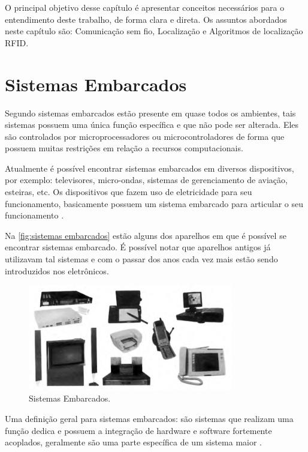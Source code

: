 \label{chapter:conceitos}
O principal objetivo desse capítulo é apresentar conceitos necessários para o entendimento deste trabalho, de forma clara e direta. Os assuntos abordados neste capítulo são: Comunicação sem fio, Localização e Algoritmos de localização RFID.
\section{Sistemas Embarcados}
    \par
    Segundo \citeauthor{rodrigo2016} sistemas embarcados estão presente em quase todos os ambientes, tais sistemas possuem uma única função específica e que não pode ser alterada. Eles são controlados por microprocessadores ou microcontroladores de forma que possuem muitas restrições em relação a recursos computacionais.

    \par
    Atualmente é possível encontrar sistemas embarcados em diversos dispositivos, por exemplo: televisores, micro-ondas, sistemas de gerenciamento de aviação, esteiras, etc. Os dispositivos que fazem uso de eletricidade para seu funcionamento, basicamente possuem um sistema embarcado para articular o seu funcionamento \cite{rodrigo2016}.
    
    \par
    Na \autoref{fig:sistemas embarcados} estão alguns dos aparelhos em que é possível se encontrar sistemas embarcado. É possível notar que aparelhos antigos já utilizavam tal sistemas e com o passar dos anos cada vez mais estão sendo introduzidos nos eletrônicos.
    \begin{figure}[h!]
              \caption{\label{fig:sistemas embarcados}{Sistemas Embarcados.}}
              \centering
              \includegraphics[width=0.8\textwidth]{Figuras/systems_embedded.PNG}
            \end{figure}
    \par
    Uma definição geral para sistemas embarcados: são sistemas que realizam uma função dedica e possuem a integração de hardware e software fortemente acoplados, geralmente são uma parte específica de um sistema maior \cite{Li:2003:RCE:829584}.
    
